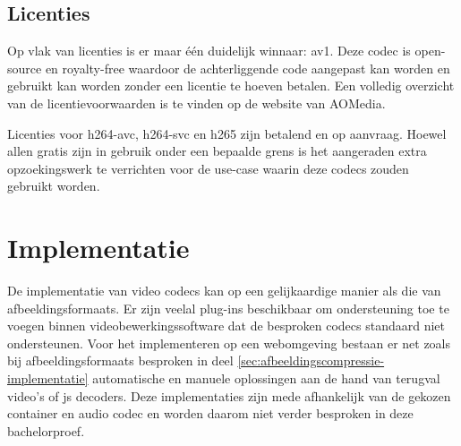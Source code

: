 \subsection{Licenties}
\label{sec:videocompressie-licentie}

Op vlak van licenties is er maar één duidelijk winnaar: \gls{av1}. Deze \gls{codec} is \gls{open-source} en royalty-free waardoor de achterliggende code aangepast kan worden en gebruikt kan worden zonder een licentie te hoeven betalen. Een volledig overzicht van de licentievoorwaarden is te vinden op de website van AOMedia.

Licenties voor \gls{h264-avc}, \gls{h264-svc} en \gls{h265} zijn betalend en op aanvraag. Hoewel allen gratis zijn in gebruik onder een bepaalde grens is het aangeraden extra opzoekingswerk te verrichten voor de \gls{use-case} waarin deze \glspl{codec} zouden gebruikt worden.

\section{Implementatie}
\label{sec:videocompressie-implementatie}

De implementatie van video \glspl{codec} kan op een gelijkaardige manier als die van \glspl{afbeeldingsformaat}. Er zijn veelal \glspl{plug-in} beschikbaar om ondersteuning toe te voegen binnen videobewerkingssoftware dat de besproken \glspl{codec} standaard niet ondersteunen. Voor het implementeren op een webomgeving bestaan er net zoals bij \glspl{afbeeldingsformaat} besproken in deel \ref{sec:afbeeldingscompressie-implementatie} automatische en manuele oplossingen aan de hand van terugval video's of \gls{js} \glspl{decoder}. Deze implementaties zijn mede afhankelijk van de gekozen \gls{container} en audio \gls{codec} en worden daarom niet verder besproken in deze bachelorproef.
